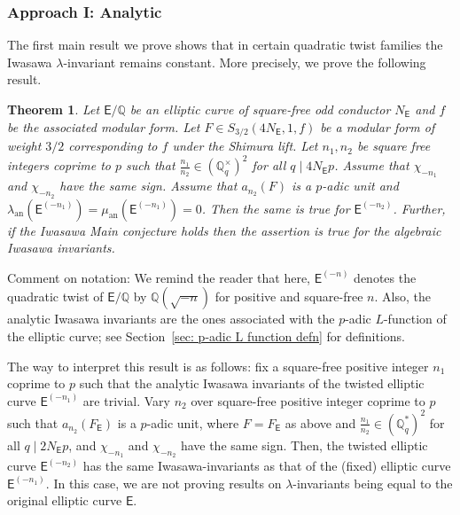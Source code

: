 \documentclass{amsart}
\newcommand{\DK}[1]{\textcolor{purple}{#1}}
\numberwithin{equation}{section}
\newtheorem{lthm}{Theorem}
\theoremstyle{remark}
\newcommand{\an}{\operatorname{an}}
\newcommand{\Q}{\mathbb{Q}}
\newcommand{\EC}{\mathsf{E}}
\theoremstyle{plain} %
\begin{document}

\subsubsection*{Approach I: Analytic}

The first main result we prove shows that in certain quadratic twist families the Iwasawa $\lambda$-invariant remains constant.
More precisely, we prove the following result.

\begin{lthm}
\label{thm A}
Let $\EC/\Q$ be an elliptic curve of square-free odd conductor {$N_{\EC}$} and $f$ be the associated modular form.
Let $F\in S_{3/2}(4N_{{\EC}},1,f)$ be a modular form of weight $3/2$ corresponding to $f$ under the Shimura lift.
Let $n_1, n_2$ be square free integers coprime to $p$ such that $\frac{n_1}{n_2}\in (\Q_q^\times)^2$ for all $q\mid 4N_{\EC}p$.
Assume that $\chi_{-n_1}$ and $\chi_{-n_2}$ have the same sign.
Assume that $a_{n_2}(F)$ is a $p$-adic unit and $\lambda_{\an}(\EC^{(-n_1)})=\mu_{\an}(\EC^{(-n_1)})=0$.
Then the same is true for $\EC^{(-n_2)}$.
Further, if the Iwasawa Main conjecture holds then the assertion is true for the algebraic Iwasawa invariants.
\end{lthm}

Comment on notation: We remind the reader that here, $\EC^{(-n)}$ denotes the quadratic twist of $\EC/\Q$ by $\Q(\sqrt{-n})$ for positive and square-free $n$.
Also, the analytic Iwasawa invariants are the ones associated with the $p$-adic $L$-function of the elliptic curve; see Section~\ref{sec: p-adic L function defn} for definitions.

The way to interpret this result is as follows: fix a square-free positive integer $n_{1}$ coprime to $p$ such that the analytic Iwasawa invariants of the twisted elliptic curve $\EC^{(-n_1)}$ are trivial.
Vary $n_2$ over square-free positive integer coprime to $p$ such that $a_{n_2}(F_{\EC})$ is a $p$-adic unit, where $F=F_{\EC}$ as above and $\frac{n_1}{n_2}\in (\Q_q^*)^{2}$ for all $q\mid 2N_{\EC}p$, and $\chi_{-n_1}$ and $\chi_{-n_2}$ have the same sign.
Then, the twisted elliptic curve $\EC^{(-n_{2})}$ has the same Iwasawa-invariants as that of the (fixed) elliptic curve $\EC^{(-n_{1})}$.
In this case, we are not proving results on $\lambda$-invariants being equal to the original elliptic curve $\EC$.
\end{document}
